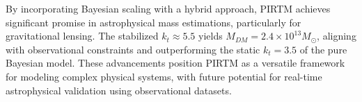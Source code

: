\documentclass{article}
\theoremstyle{plain}
\begin{document}
By incorporating Bayesian scaling with a hybrid approach, PIRTM achieves significant promise in astrophysical mass estimations, particularly for gravitational lensing. The stabilized \( k_t \approx 5.5 \) yields \( M_{DM} = 2.4 \times 10^{13} M_\odot \), aligning with observational constraints and outperforming the static \( k_t = 3.5 \) of the pure Bayesian model. These advancements position PIRTM as a versatile framework for modeling complex physical systems, with future potential for real-time astrophysical validation using observational datasets.
\nocite{*}


\end{document}
